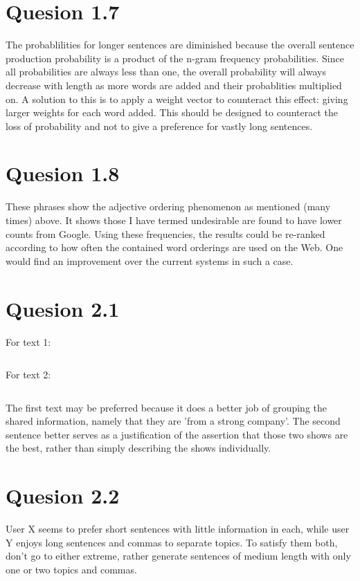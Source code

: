 \documentclass[a4paper,11pt,oneside]{article}
\begin{document}
\section{Quesion 1.7}
The probablilities for longer sentences are diminished because the overall sentence production probability is a product of the n-gram frequency probabilities. Since all probabilities are always less than one, the overall probability will always decrease with length as more words are added and their probablities multiplied on. A solution to this is to apply a weight vector to counteract this effect: giving larger weights for each word added. This should be designed to counteract the loss of probability and not to give a preference for vastly long sentences.

\section{Quesion 1.8}
These phrases show the adjective ordering phenomenon as mentioned (many times) above. It shows those I have termed undesirable are found to have lower counts from Google. Using these frequencies, the results could be re-ranked according to how often the contained word orderings are used on the Web. One would find an improvement over the current systems in such a case.

\section{Quesion 2.1}

For text 1:
\begin{verbatim}

\end{verbatim}

For text 2:
\begin{verbatim}

\end{verbatim}

The first text may be preferred because it does a better job of grouping the shared information, namely that they are 'from a strong company'. The second sentence better serves as a justification of the assertion that those two shows are the best, rather than simply describing the shows individually.

\section{Quesion 2.2}
User X seems to prefer short sentences with little information in each, while user Y enjoys long sentences and commas to separate topics. To satisfy them both, don't go to either extreme, rather generate sentences of medium length with only one or two topics and commas.
\end{document}
